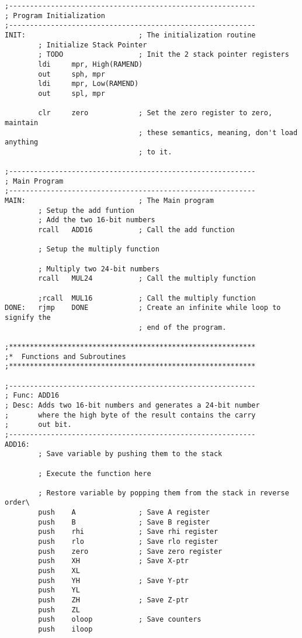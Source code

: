 \documentclass[12pt,letterpaper]{article}
\begin{document}
\begin{verbatim}
;-----------------------------------------------------------
; Program Initialization
;-----------------------------------------------------------
INIT:                           ; The initialization routine
        ; Initialize Stack Pointer
        ; TODO                  ; Init the 2 stack pointer registers
        ldi     mpr, High(RAMEND)
        out     sph, mpr
        ldi     mpr, Low(RAMEND)
        out     spl, mpr

        clr     zero            ; Set the zero register to zero, maintain
                                ; these semantics, meaning, don't load anything
                                ; to it.

;-----------------------------------------------------------
; Main Program
;-----------------------------------------------------------
MAIN:                           ; The Main program
        ; Setup the add funtion
        ; Add the two 16-bit numbers
        rcall   ADD16           ; Call the add function

        ; Setup the multiply function

        ; Multiply two 24-bit numbers
        rcall   MUL24           ; Call the multiply function

        ;rcall  MUL16           ; Call the multiply function
DONE:   rjmp    DONE            ; Create an infinite while loop to signify the
                                ; end of the program.

;***********************************************************
;*  Functions and Subroutines
;***********************************************************

;-----------------------------------------------------------
; Func: ADD16
; Desc: Adds two 16-bit numbers and generates a 24-bit number
;       where the high byte of the result contains the carry
;       out bit.
;-----------------------------------------------------------
ADD16:
        ; Save variable by pushing them to the stack

        ; Execute the function here

        ; Restore variable by popping them from the stack in reverse order\
        push    A               ; Save A register
        push    B               ; Save B register
        push    rhi             ; Save rhi register
        push    rlo             ; Save rlo register
        push    zero            ; Save zero register
        push    XH              ; Save X-ptr
        push    XL
        push    YH              ; Save Y-ptr
        push    YL
        push    ZH              ; Save Z-ptr
        push    ZL
        push    oloop           ; Save counters
        push    iloop


\end{verbatim}
\end{document}
